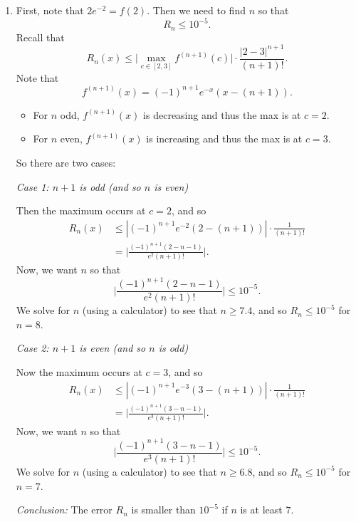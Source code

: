 \documentclass[handout]{ximera}
\begin{document}
\begin{problem}
\begin{freeResponse}
\begin{enumerate}
	\item  First, note that $2e^{-2} = f(2)$.  
	Then we need to find $n$ so that
		\[
		R_n \leq 10^{-5}.
		\]
	Recall that
		\[
		R_n(x) \leq \biggr| \max_{c \in [2,3]} f^{(n+1)}(c) \biggr| \cdot \frac{|2-3|^{n+1}}{(n+1)!}.
		\]
	Note that
		\[
		f^{(n+1)}(x) = (-1)^{n+1} e^{-x} (x - (n+1)).
		\]
	\begin{itemize}
	\item For $n$ odd, $f^{(n+1)}(x)$ is decreasing and thus the max is at $c=2$.
	\item For $n$ even, $f^{(n+1)}(x)$ is increasing and thus the max is at $c=3$.  
	\end{itemize}
	
	So there are two cases:
	
	\vskip 10pt
	
	{\it Case 1:  $n+1$ is odd (and so $n$ is even)}
	
	Then the maximum occurs at $c=2$, and so
		\begin{align*}
		R_n(x) &\leq | (-1)^{n+1} e^{-2} (2 - (n+1)) | \cdot \frac{1}{(n+1)!}  \\
		&= \biggr| \frac{(-1)^{n+1} (2-n-1)}{e^2 (n+1)!} \biggr| .
		\end{align*}
	Now, we want $n$ so that 
		\[
		\biggr| \frac{(-1)^{n+1} (2-n-1)}{e^2 (n+1)!} \biggr| \leq 10^{-5}.
		\]
	We solve for $n$ (using a calculator) to see that $n \geq 7.4$, and so $R_n \leq 10^{-5}$ for $n = 8$.
	
	\vskip 10pt
	
	{\it Case 2:  $n+1$ is even (and so $n$ is odd)}
	
	Now the maximum occurs at $c=3$, and so
		\begin{align*}
		R_n(x) &\leq | (-1)^{n+1} e^{-3} (3 - (n+1)) | \cdot \frac{1}{(n+1)!}  \\
		&= \biggr| \frac{(-1)^{n+1} (3-n-1)}{e^3 (n+1)!} \biggr| .
		\end{align*}
	Now, we want $n$ so that 
		\[
		\biggr| \frac{(-1)^{n+1} (3-n-1)}{e^3 (n+1)!} \biggr| \leq 10^{-5}.
		\]
	We solve for $n$ (using a calculator) to see that $n \geq 6.8$, and so $R_n \leq 10^{-5}$ for $n = 7$.
	
	\vskip 10pt
	
	{\it Conclusion:} The error $R_n$ is smaller than $10^{-5}$ if $n$ is at least $7$.
	
	
	
	\end{enumerate}
	\end{freeResponse}

\end{problem}
\end{document}
